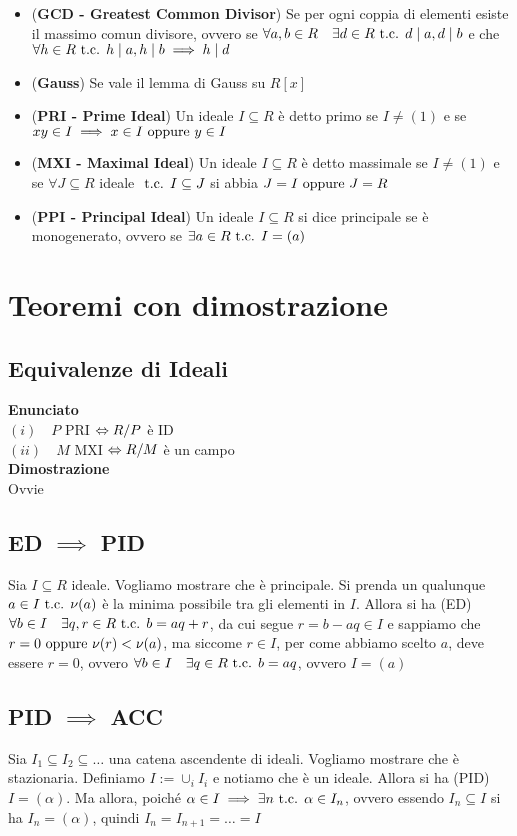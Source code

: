 \documentclass[a4paper,GeneralMath,NoNotes]{stdmdoc}
\newcommand{\Enunciato}{\vskip 0.05cm \noindent \textbf{Enunciato} \\ }
\renewcommand{\Dimostrazione}{\vskip 0.05cm \noindent \textbf{Dimostrazione} \\ }
\begin{document}
\begin{itemize}
		\item ({\bf GCD - Greatest Common Divisor}) Se per ogni coppia di elementi esiste il massimo comun divisore, ovvero se $\forall a, b \in R \quad \exists d \in R \mbox{ t.c. } d \mid a, d \mid b$ e che $\forall h \in R \mbox{ t.c. } h \mid a, h \mid b \implies h \mid d$
		\item ({\bf Gauss}) Se vale il lemma di Gauss su $R[x]$
		\item ({\bf PRI - Prime Ideal}) Un ideale $I \subseteq R$ è detto primo se $I \neq (1)$ e se $xy \in I \implies x \in I \text{ oppure } y \in I$
		\item ({\bf MXI - Maximal Ideal}) Un ideale $I \subseteq R$ è detto massimale se $I \neq (1)$ e se $\forall J \subseteq R$ ideale $\mbox{ t.c. } I \subseteq J$ si abbia $J = I \text{ oppure } J = R$
		\item ({\bf PPI - Principal Ideal}) Un ideale $I \subseteq R$ si dice principale se è monogenerato, ovvero se $\exists a \in R \mbox{ t.c. } I = (a)$
	\end{itemize}

	\section*{Teoremi con dimostrazione}
	\subsection{Equivalenze di Ideali}
	\Enunciato
		$(i) \quad P $ PRI $\Leftrightarrow R/P$ è ID \\
		$(ii) \quad M $ MXI $\Leftrightarrow R/M$ è un campo \\
	\Dimostrazione Ovvie

	\subsection{ED $\implies$ PID}
	Sia $I \subseteq R$ ideale. Vogliamo mostrare che è principale. Si prenda un qualunque $a \in I \mbox{ t.c. } \nu(a)$ è la minima possibile tra gli elementi in $I$. Allora si ha (ED) $\forall b \in I \quad \exists q,r \in R \mbox{ t.c. } b = aq + r$, da cui segue $r = b - aq \in I$ e sappiamo che $r = 0 \text{ oppure } \nu(r) < \nu(a)$, ma siccome $r \in I$, per come abbiamo scelto $a$, deve essere $r = 0$, ovvero $\forall b \in I \quad \exists q \in R \mbox{ t.c. } b = aq$, ovvero $I = (a)$
	
	\subsection{PID $\implies$ ACC}
	Sia $I_1 \subseteq I_2 \subseteq \ldots$ una catena ascendente di ideali. Vogliamo mostrare che è stazionaria. Definiamo $I := \cup_{i} I_i$ e notiamo che è un ideale. Allora si ha (PID) $I = (\alpha)$. Ma allora, poiché $\alpha \in I \implies \exists n \mbox{ t.c. } \alpha \in I_n$, ovvero essendo $I_n \subseteq I$ si ha $I_n = (\alpha)$, quindi $I_n = I_{n+1} = \ldots = I$
\end{document}
